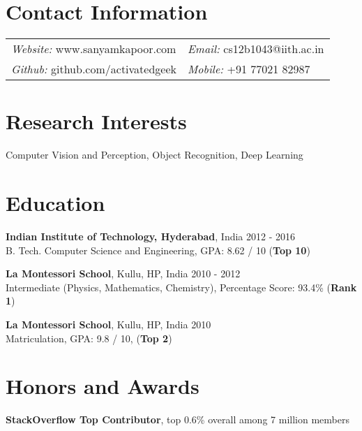 \documentclass[margin,line]{res}
\begin{document}

\begin{resume}

\section{\sc Contact Information}

  \vspace{.05in}

  \begin{tabular}{@{}p{2.9in}p{6in}}
	{\it Website:} www.sanyamkapoor.com & {\it Email:} cs12b1043@iith.ac.in \\
	{\it Github:} github.com/activatedgeek & {\it Mobile:} +91 77021 82987  \\
  \end{tabular}

\section{\sc Research Interests}
  Computer Vision and Perception, Object Recognition, Deep Learning

\section{\sc Education}

  {\bf Indian Institute of Technology, Hyderabad}, India \hfill 2012 - 2016 \\
  	B. Tech. Computer Science and Engineering,
	GPA: 8.62 / 10 ({\bf Top 10})

  \vspace*{-2.5mm}

  {\bf La Montessori School}, Kullu, HP, India \hfill 2010 - 2012 \\
	Intermediate (Physics, Mathematics, Chemistry),
    Percentage Score: 93.4\% ({\bf Rank 1})

  \vspace*{-2.5mm}

  {\bf La Montessori School}, Kullu, HP, India \hfill 2010 \\
	Matriculation,
    GPA: 9.8 / 10, ({\bf Top 2})

\section{\sc Honors and Awards}

  {\bf StackOverflow Top Contributor}, top 0.6\% overall among 7 million members


\end{resume}
\end{document}

